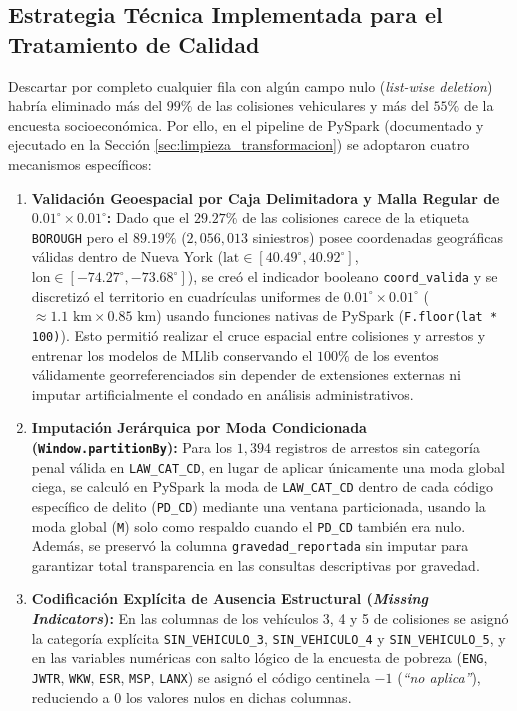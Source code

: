 \documentclass[11pt,a4paper]{article}
\begin{document}
\subsection{Estrategia Técnica Implementada para el Tratamiento de Calidad}
\label{subsec:tecnicas_faltantes}

Descartar por completo cualquier fila con algún campo nulo (\textit{list-wise deletion}) habría eliminado más del $99\%$ de las colisiones vehiculares y más del $55\%$ de la encuesta socioeconómica. Por ello, en el pipeline de PySpark (documentado y ejecutado en la Sección \ref{sec:limpieza_transformacion}) se adoptaron cuatro mecanismos específicos:

\begin{enumerate}
    \item \textbf{Validación Geoespacial por Caja Delimitadora y Malla Regular de $0.01^\circ \times 0.01^\circ$:} Dado que el $29.27\%$ de las colisiones carece de la etiqueta \texttt{BOROUGH} pero el $89.19\%$ ($2,056,013$ siniestros) posee coordenadas geográficas válidas dentro de Nueva York ($\text{lat} \in [40.49^\circ, 40.92^\circ]$, $\text{lon} \in [-74.27^\circ, -73.68^\circ]$), se creó el indicador booleano \texttt{coord\_valida} y se discretizó el territorio en cuadrículas uniformes de $0.01^\circ \times 0.01^\circ$ ($\approx 1.1\text{ km} \times 0.85\text{ km}$) usando funciones nativas de PySpark (\texttt{F.floor(lat * 100)}). Esto permitió realizar el cruce espacial entre colisiones y arrestos y entrenar los modelos de MLlib conservando el $100\%$ de los eventos válidamente georreferenciados sin depender de extensiones externas ni imputar artificialmente el condado en análisis administrativos.
    \item \textbf{Imputación Jerárquica por Moda Condicionada (\texttt{Window.partitionBy}):} Para los $1,394$ registros de arrestos sin categoría penal válida en \texttt{LAW\_CAT\_CD}, en lugar de aplicar únicamente una moda global ciega, se calculó en PySpark la moda de \texttt{LAW\_CAT\_CD} dentro de cada código específico de delito (\texttt{PD\_CD}) mediante una ventana particionada, usando la moda global (\texttt{M}) solo como respaldo cuando el \texttt{PD\_CD} también era nulo. Además, se preservó la columna \texttt{gravedad\_reportada} sin imputar para garantizar total transparencia en las consultas descriptivas por gravedad.
    \item \textbf{Codificación Explícita de Ausencia Estructural (\textit{Missing Indicators}):} En las columnas de los vehículos 3, 4 y 5 de colisiones se asignó la categoría explícita \texttt{SIN\_VEHICULO\_3}, \texttt{SIN\_VEHICULO\_4} y \texttt{SIN\_VEHICULO\_5}, y en las variables numéricas con salto lógico de la encuesta de pobreza (\texttt{ENG}, \texttt{JWTR}, \texttt{WKW}, \texttt{ESR}, \texttt{MSP}, \texttt{LANX}) se asignó el código centinela $-1$ (\textit{``no aplica''}), reduciendo a $0$ los valores nulos en dichas columnas.

\end{enumerate}
\end{document}
